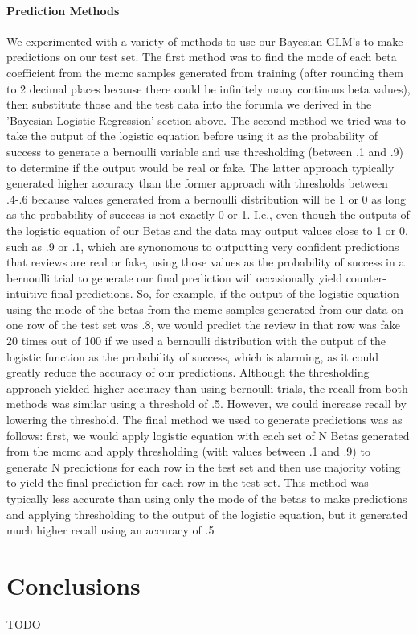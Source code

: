 \documentclass[man, floatsintext, 10pt]{apa6}
\begin{document}
\paragraph{Prediction Methods} We experimented with a variety of methods to use our Bayesian GLM's to make predictions on our test set. The first method was to find the mode of each beta coefficient from the mcmc samples generated from training (after rounding them to 2 decimal places because there could be infinitely many continous beta values), then substitute those and the test data into the forumla we derived in the 'Bayesian Logistic Regression' section above. The second method we tried was to take the output of the logistic equation before using it as the probability of success to generate a bernoulli variable and use thresholding (between .1 and .9) to determine if the output would be real or fake. The latter approach typically generated higher accuracy than the former approach with thresholds between .4-.6 because values generated from a bernoulli distribution will be 1 or 0 as long as the probability of success is not exactly 0 or 1. I.e., even though the outputs of the logistic equation of our Betas and the data may output values close to 1 or 0, such as .9 or .1, which are synonomous to outputting very confident predictions that reviews are real or fake, using those values as the probability of success in a bernoulli trial to generate our final prediction will occasionally yield counter-intuitive final predictions. So, for example, if the output of the logistic equation using the mode of the betas from the mcmc samples generated from our data on one row of the test set was .8, we would predict the review in that row was fake 20 times out of 100 if we used a bernoulli distribution with the output of the logistic function as the probability of success, which is alarming, as it could greatly reduce the accuracy of our predictions. Although the thresholding approach yielded higher accuracy than using bernoulli trials, the recall from both methods was similar using a threshold of .5. However, we could increase recall by lowering the threshold. The final method we used to generate predictions was as follows: first, we would apply logistic equation with each set of N Betas generated from the mcmc and apply thresholding (with values between .1 and .9) to generate N predictions for each row in the test set and then use majority voting to yield the final prediction for each row in the test set. This method was typically less accurate than using only the mode of the betas to make predictions and applying thresholding to the output of the logistic equation, but it generated much higher recall using an accuracy of .5

\section{Conclusions} 

TODO
\end{document}
